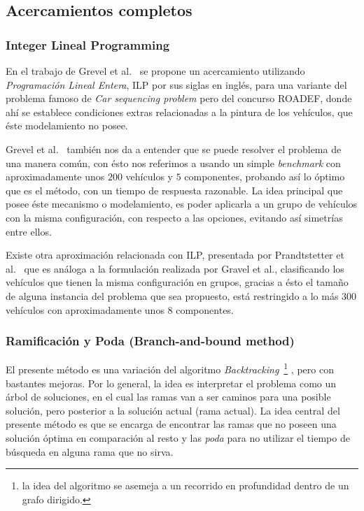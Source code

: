 \subsection{Acercamientos completos}
\subsubsection{Integer Lineal Programming}
En el trabajo de Grevel et al.~\cite{4} se propone un acercamiento utilizando
\emph{Programación Lineal Entera}, ILP por sus siglas en inglés,  para una variante
del problema famoso de \emph{Car sequencing problem} pero del concurso ROADEF,
donde ahí se establece condiciones extras relacionadas a la pintura de los vehículos,
que éste modelamiento no posee.

Grevel et al.~\cite{4} también nos da a entender que se puede resolver el problema
de una manera común, con ésto nos referimos a usando un simple \emph{benchmark}
con aproximadamente unos $200$ vehículos y $5$ componentes, probando así
lo óptimo que es el método, con un tiempo de respuesta razonable.
La idea principal que posee éste mecanismo o modelamiento, es poder aplicarla a un
grupo de vehículos con la misma configuración, con respecto a las opciones,
evitando así simetrías entre ellos.

Existe otra aproximación relacionada con ILP, presentada por Prandtstetter et al.~\cite{12}
que es análoga a la formulación realizada por Gravel et al., clasificando los vehículos
que tienen la misma configuración en grupos, gracias a ésto el tamaño de alguna instancia
del problema que sea propuesto, está restringido a lo más $300$ vehículos con aproximadamente
unos $8$ componentes.

\subsubsection{Ramificación y Poda (Branch-and-bound method)}

El presente método es una variación del algoritmo \emph{Backtracking}~\footnote{
la idea del algoritmo se asemeja a un recorrido en profundidad dentro de un grafo dirigido.
}
, pero con bastantes mejoras.
Por lo general, la idea es interpretar el problema como un árbol de soluciones,
en el cual las ramas van a ser caminos para una posible solución, pero posterior a la solución
actual (rama actual).
La idea central del presente método es que se encarga de encontrar las ramas que no poseen
una solución óptima en comparación al resto y las \emph{poda} para no utilizar el tiempo
de búsqueda en alguna rama que no sirva.

